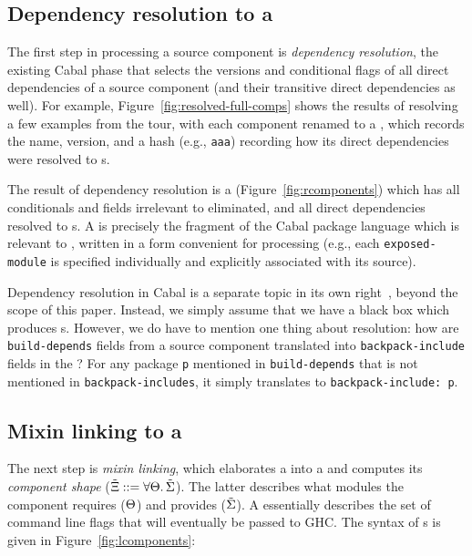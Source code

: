 \subsection{Dependency resolution to a \ccomp{}}

The first step in
processing a source component is \emph{dependency resolution},
the existing Cabal phase that
selects the versions and conditional flags of all direct dependencies of
a source component (and their transitive direct dependencies as well).
For example, Figure~\ref{fig:resolved-full-comps} shows the results
of resolving a few examples from the tour, with each component renamed to
a \cid{}, which records the name, version, and a hash (e.g., \verb|aaa|)
recording how its direct dependencies were resolved to \cid{}s.

The result of dependency resolution is a \emph{\ccomp}
(Figure~\ref{fig:rcomponents}) which has all conditionals and fields
irrelevant to \Backpack{} eliminated, and all direct dependencies
resolved to \cid{}s.  A \ccomp{} is precisely the fragment of the
Cabal package language which is relevant to \Backpack{}, written in a
form convenient for processing (e.g., each \verb|exposed-module| is
specified individually and explicitly associated with its source).

Dependency resolution in Cabal is a separate topic in its own
right~\cite{well-typed-solver, well-typed-qualified}, beyond the scope of this paper.
Instead, we simply assume that we have a black box which
produces \ccomp{}s.  However, we do have to mention one thing about resolution:
how are \verb|build-depends| fields from
a source component translated into \verb|backpack-include| fields in the
\ccomp{}?  For any package \verb|p|
mentioned in \verb|build-depends| that is not mentioned in
\verb|backpack-includes|, it simply translates to
\verb|backpack-include: p|.



\subsection{Mixin linking to a \unit{}}
\label{sec:overview-mixin}

The next step is \emph{mixin linking}, which 
elaborates a \ccomp{} into a \emph{\unit{}} and computes its
\emph{component shape} (${\tilde{\Xi}} ::= \forall \Theta.\, {\tilde{\Sigma}}$).
The latter describes what modules the
component requires ($\Theta$) and provides (${\tilde{\Sigma}}$).
A \unit{} essentially describes the set of command line flags that will
eventually be passed to GHC\@. The syntax of \unit{}s is given in
Figure~\ref{fig:lcomponents}:

